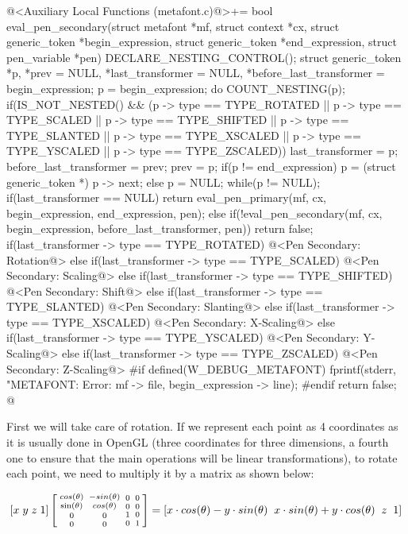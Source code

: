 \iniciocodigo
@<Auxiliary Local Functions (metafont.c)@>+=
bool eval_pen_secondary(struct metafont *mf, struct context *cx,
                        struct generic_token *begin_expression,
                        struct generic_token *end_expression,
                        struct pen_variable *pen){
  DECLARE_NESTING_CONTROL();
  struct generic_token *p, *prev = NULL, *last_transformer = NULL,
                       *before_last_transformer = begin_expression;
  p = begin_expression;
  do{
    COUNT_NESTING(p);
    if(IS_NOT_NESTED() && (p -> type == TYPE_ROTATED ||
       p -> type == TYPE_SCALED || p -> type == TYPE_SHIFTED ||
       p -> type == TYPE_SLANTED || p -> type == TYPE_XSCALED ||
       p -> type == TYPE_YSCALED || p -> type == TYPE_ZSCALED)){
      last_transformer = p;
      before_last_transformer = prev;
    }
    prev = p;
    if(p != end_expression)
      p = (struct generic_token *) p -> next;
    else
      p = NULL;
  }while(p != NULL);
  if(last_transformer == NULL)
    return eval_pen_primary(mf, cx, begin_expression, end_expression, pen);
  else{
    if(!eval_pen_secondary(mf, cx, begin_expression, before_last_transformer, pen))
      return false;
    if(last_transformer -> type == TYPE_ROTATED){
      @<Pen Secondary: Rotation@>
    }
    else if(last_transformer -> type == TYPE_SCALED){
      @<Pen Secondary: Scaling@>
    }
    else if(last_transformer -> type == TYPE_SHIFTED){
      @<Pen Secondary: Shift@>
    }
    else if(last_transformer -> type == TYPE_SLANTED){
      @<Pen Secondary: Slanting@>
    }
    else if(last_transformer -> type == TYPE_XSCALED){
      @<Pen Secondary: X-Scaling@>
    }
    else if(last_transformer -> type == TYPE_YSCALED){
      @<Pen Secondary: Y-Scaling@>
    }
    else if(last_transformer -> type == TYPE_ZSCALED){
      @<Pen Secondary: Z-Scaling@>
    }
#if defined(W_DEBUG_METAFONT)
    fprintf(stderr, "METAFONT: Error: %
            mf -> file, begin_expression -> line);
#endif
    return false;
  }
}
@
\fimcodigo

First we will take care of rotation. If we represent each point as 4
coordinates as it is usually done in OpenGL (three coordinates for
three dimensions, a fourth one to ensure that the main operations will
be linear transformations), to rotate each point, we need to multiply
it by a matrix as shown below:

$$\left[x\; y\; z\; 1\right]\left[{{cos(\theta) \atop \sin(\theta)}\atop
      {0\atop 0}}{{-sin(\theta) \atop cos(\theta)}\atop {0 \atop
      0}}{{0\atop 0}\atop{1 \atop 0}}{{0 \atop 0}\atop{0\atop
      1}}\right]=\left[x\cdot cos(\theta) - y\cdot sin(\theta)\;\;
      x\cdot sin(\theta) + y\cdot cos(\theta)\;\; z\;\; 1\right]
$$

